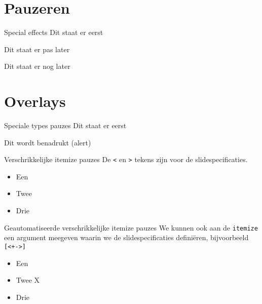 \documentclass
[kulak] %
{kulakbeamer}
\begin{document}
	\section{Pauzeren}
	
	\begin{frame}{Special effects}
		Dit staat er eerst
		
		\pause
		
		Dit staat er pas later
		
		\pause
		
		Dit staat er nog later
	\end{frame}
	
	\section{Overlays}
	
	\begin{frame}{Speciale types pauzes}
		Dit staat er eerst
		
		
		
		\alert<2>{Dit wordt benadrukt (alert)}
	\end{frame}
	
	\begin{frame}{Verschrikkelijke itemize pauzes}
		De \texttt{<} en \texttt{>} tekens zijn voor de slidespecificaties.
		\begin{itemize}
			\item<1-> Een
			\item<2-> Twee \hypertarget<2>{targetlabel2}{}
			\item<3-> Drie
		\end{itemize}
	\end{frame}
	
	\begin{frame}{Geautomatiseerde verschrikkelijke itemize pauzes}
		We kunnen ook aan de \texttt{itemize} een argument meegeven waarin we de slidespecificaties definiëren, bijvoorbeeld \texttt{[<+->]}
		\begin{itemize}[<+->]
			\item Een
			\item Twee \hypertarget{targetlabel}{X}
			\item Drie
		\end{itemize}
	\end{frame}
	
\end{document}
